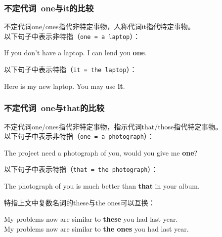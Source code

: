 \documentclass[UTF8]{ctexart}
\newcommand{\littf}[1]{{\hspace{3pt}\ttfamily #1}}
\begin{document}
\newpage

\subsubsection{不定代词~\littf{one}与\littf{it}的比较}
    不定代词\littf{one/ones}指代非特定事物，人称代词\littf{it}指代特定事物。\\[3mm]
    以下句子中表示非特指（\texttt{one = a laptop}）：
    \begin{center}
        \ttfamily\large
        If you don't have a laptop. I can lend you \textbf{one}.\\[6mm]
    \end{center}
    以下句子中表示特指（\texttt{it = the laptop}）：
    \begin{center}
        \ttfamily\large
        Here is my new laptop. You may use \textbf{it}.
    \end{center}\vspace{10pt}

\subsubsection{不定代词~\littf{one}与\littf{that}的比较}
    不定代词\littf{one/ones}指代非特定事物，指示代词\littf{that/those}指代特定事物。\\[3mm]
    以下句子中表示非特指（\texttt{one = a photograph}）：
    \begin{center}
        \ttfamily\large
        The project need a photograph of you, would you give me \textbf{one}?\\[6mm]
    \end{center}
    以下句子中表示特指（\texttt{that = the photograph}）：
    \begin{center}
        \ttfamily\large
        The photograph of you is much better than \textbf{that} in your album.\\[6mm]
    \end{center}
    特指上文中复数名词的\littf{these}与\littf{the ones}可以互换：
    \begin{center}
        \ttfamily\large
        My problems now are similar to \textbf{these} you had last year.\\[3mm]
        My problems now are similar to \textbf{the ones} you had last year.
    \end{center}\vspace{10pt}
\end{document}
